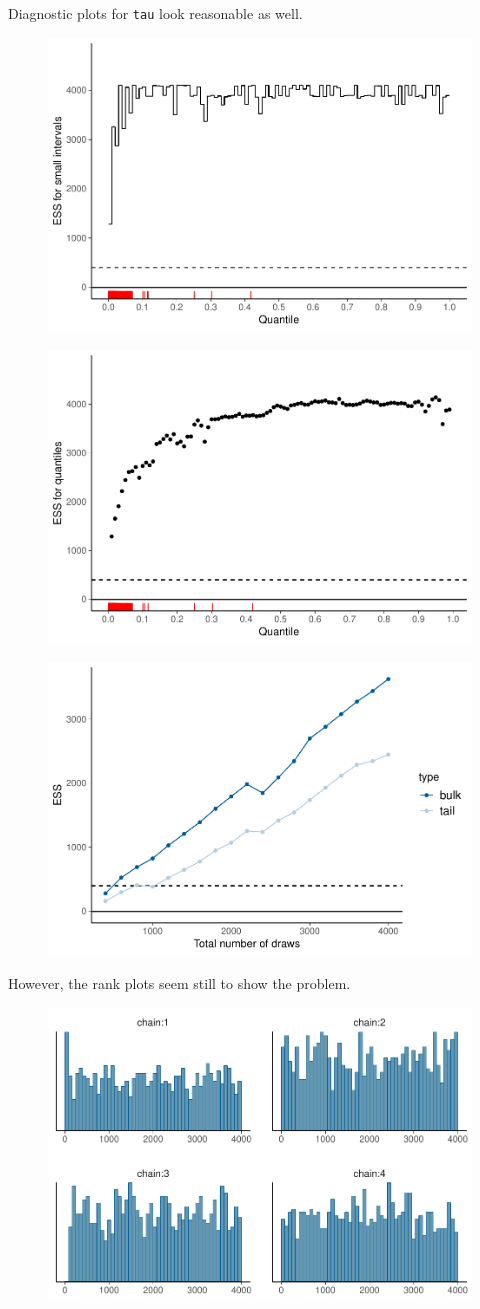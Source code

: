 \documentclass[american,]{article}
\begin{document}
Diagnostic plots for \texttt{tau} look reasonable as well.

\begin{figure}[tp]
  \centering
  \includegraphics[width=0.6\linewidth]{graphics/local-ess-fit-cp4-tau-1.pdf}
\end{figure}

\begin{figure}[tp]
  \centering
  \includegraphics[width=0.6\linewidth]{graphics/quantile-ess-fit-cp4-tau-1.pdf}
\end{figure}

\begin{figure}[tp]
  \centering
  \includegraphics[width=0.6\linewidth]{graphics/change-ess-fit-cp4-tau-1.pdf}
\end{figure}

However, the rank plots seem still to show the problem.

\begin{figure}[tp]
  \centering
  \includegraphics[width=0.6\linewidth]{graphics/hist-fit-cp4-tau-1.pdf}
\end{figure}
\end{document}
